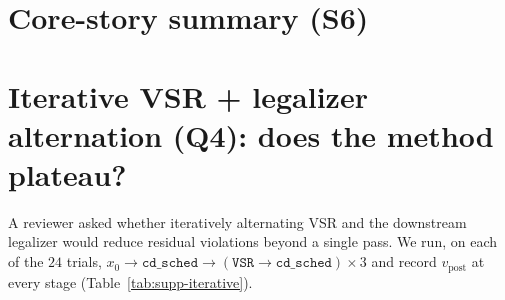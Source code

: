 \documentclass{article}
\begin{document}
\begin{table}[h]
\centering
\small

\caption{Sensitivity check: \texttt{cd-std} (legality-only) as the
second-stage legalizer.  Cross-circuit medians and per-circuit
win counts are similar to \texttt{cd-sched}: VSR pre-conditioning
nudges medians in the right direction but the difference is small in
absolute terms.  Full legality remains $0/24$ under either pipeline.
Raw rows: \texttt{results/vsr\_extra/cdstd\_pipeline.json}.}
\label{tab:supp-cdstd-pipeline}
\end{table}

\section{Core-story summary (S6)}
\label{sec:supp-core-summary}

\begin{table}[h]
\centering
\small

\caption{Cross-circuit median residual $v_\text{post}$ and full
legality count across every treatment in the paper.  $\mathbf{0/24}$
fully legal under every treatment, including the strongest pipeline
(DREAMPlace + any pre-conditioner).  Force-directed pre-conditioning
(VSR-post or classical FD) roughly halves the raw count both alone
and with DREAMPlace; the downstream gain is not unique to VSR.}
\label{tab:core_summary}
\end{table}

\section{Iterative VSR + legalizer alternation (Q4): does the method plateau?}
\label{sec:supp-iterative}

A reviewer asked whether iteratively alternating VSR and the
downstream legalizer would reduce residual violations beyond a single
pass.  We run, on each of the $24$ trials,
$x_0 \to \texttt{cd\_sched} \to (\texttt{VSR} \to \texttt{cd\_sched}) \times 3$
and record $v_\text{post}$ at every stage
(Table~\ref{tab:supp-iterative}).

\begin{table}[h]
\centering
\small

\caption{Iterative VSR / cd-sched alternation, $24$ trials.
\textbf{The two operators are antagonistic:} a VSR pass cuts $v_\text{post}$
by another $\sim 8$k, then the next cd-sched pass restores roughly the
same amount.  Iteration oscillates between two basins of attraction
($\sim 17$k after VSR, $\sim 24$k after cd-sched) rather than
plateauing at zero.  The lowest $v_\text{post}$ achievable is
$\sim 17$k after the first VSR step --- additional iteration does not
help, because cd-sched re-places macros to satisfy density constraints
that conflict with VSR's overlap reduction.  The remaining $\sim 17$k
overlaps appear structural for these benchmarks.}
\label{tab:supp-iterative}
\end{table}
\end{document}
